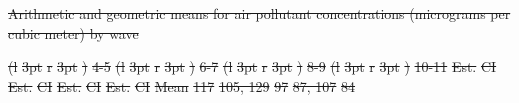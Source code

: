 \documentclass[
  letterpaper,
  DIV=11,
  numbers=noendperiod]{scrartcl}
\makeatletter
\renewenvironment{table}%
   {\renewcommand\familydefault\sfdefault
    \@float{table}}
   {\end@float}
\providecommand{\DIFadd}[1]{{\protect\color{blue}\underline{#1}}} %
\providecommand{\DIFdel}[1]{{\protect\color{red}\sout{#1}}}                      %
\providecommand{\DIFdelbegin}{} %
\providecommand{\DIFdelend}{} %
\providecommand{\DIFaddFL}[1]{\DIFadd{#1}} %
\providecommand{\DIFdelFL}[1]{\DIFdel{#1}} %
\providecommand{\DIFaddbeginFL}{} %
\providecommand{\DIFaddendFL}{} %
\providecommand{\DIFdelbeginFL}{} %
\providecommand{\DIFdelendFL}{} %
\newcommand{\DIFscaledelfig}{0.5}
\newlength{\DIFdelgraphicswidth} %
\newlength{\DIFdelgraphicsheight} %
\newcommand{\DIFaddincludegraphics}[2][]{{\color{blue}\fbox{\DIFOincludegraphics[#1]{#2}}}} %
\newcommand{\DIFdelincludegraphics}[2][]{%
\sbox{\DIFdelgraphicsbox}{\DIFOincludegraphics[#1]{#2}}%
\settoboxwidth{\DIFdelgraphicswidth}{\DIFdelgraphicsbox} %
\settoboxtotalheight{\DIFdelgraphicsheight}{\DIFdelgraphicsbox} %
\scalebox{\DIFscaledelfig}{%
\parbox[b]{\DIFdelgraphicswidth}{\usebox{\DIFdelgraphicsbox}\\[-\baselineskip] \rule{\DIFdelgraphicswidth}{0em}}\llap{\resizebox{\DIFdelgraphicswidth}{\DIFdelgraphicsheight}{%
\setlength{\unitlength}{\DIFdelgraphicswidth}%
\begin{picture}(1,1)%
\thicklines\linethickness{2pt} %
{\color[rgb]{1,0,0}\put(0,0){\framebox(1,1){}}}%
{\color[rgb]{1,0,0}\put(0,0){\line( 1,1){1}}}%
{\color[rgb]{1,0,0}\put(0,1){\line(1,-1){1}}}%
\end{picture}%
}\hspace*{3pt}}} %
} %
\DeclareRobustCommand{\DIFdelbegin}{\DIFOdelbegin \let\includegraphics\DIFdelincludegraphics} %
\DeclareRobustCommand{\DIFdelend}{\DIFOaddend \let\includegraphics\DIFOincludegraphics} %
\DeclareRobustCommand{\DIFaddbeginFL}{\DIFOaddbeginFL \let\includegraphics\DIFaddincludegraphics} %
\DeclareRobustCommand{\DIFaddendFL}{\DIFOaddendFL \let\includegraphics\DIFOincludegraphics} %
\DeclareRobustCommand{\DIFdelbeginFL}{\DIFOdelbeginFL \let\includegraphics\DIFdelincludegraphics} %
\DeclareRobustCommand{\DIFdelendFL}{\DIFOaddendFL \let\includegraphics\DIFOincludegraphics} %
\makeatother
\begin{document}
\DIFdelbegin %
\DIFdelend \begin{table}
\DIFdelbeginFL %
{%
\DIFdelFL{Arithmetic and geometric means for air pollutant concentrations
(micrograms per cubic meter) by wave }}%
\DIFdelendFL 

\DIFdelbeginFL %
\DIFdelendFL \DIFaddbeginFL \caption{\label{tbl-pm-season}\DIFaddFL{Arithmetic and geometric means for air
pollutant concentrations (micrograms per cubic meter) by wave.}}
\DIFaddendFL 

\DIFdelbeginFL %
\DIFdelFL{(l}%
\DIFdelFL{3pt}%
\DIFdelFL{r}%
\DIFdelFL{3pt}%
\DIFdelFL{)}%
\DIFdelFL{4-5}%
\DIFdelFL{(l}%
\DIFdelFL{3pt}%
\DIFdelFL{r}%
\DIFdelFL{3pt}%
\DIFdelFL{)}%
\DIFdelFL{6-7}%
\DIFdelFL{(l}%
\DIFdelFL{3pt}%
\DIFdelFL{r}%
\DIFdelFL{3pt}%
\DIFdelFL{)}%
\DIFdelFL{8-9}%
\DIFdelFL{(l}%
\DIFdelFL{3pt}%
\DIFdelFL{r}%
\DIFdelFL{3pt}%
\DIFdelFL{)}%
\DIFdelFL{10-11}%
\DIFdelFL{Est. }%
\DIFdelFL{CI }%
\DIFdelFL{Est. }%
\DIFdelFL{CI }%
\DIFdelFL{Est. }%
\DIFdelFL{CI }%
\DIFdelFL{Est. }%
\DIFdelFL{CI}%
\DIFdelFL{Mean }%
\DIFdelFL{117 }%
\DIFdelFL{105, 129}%
\DIFdelFL{97 }%
\DIFdelFL{87, 107}%
\DIFdelFL{84 }%

\end{table}
\end{document}
